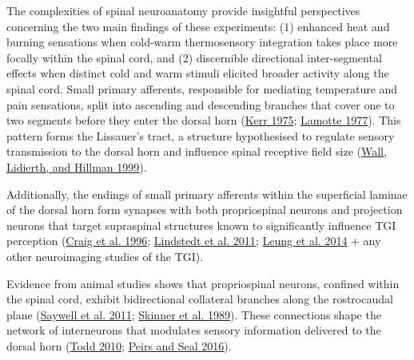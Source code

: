 \documentclass[
]{article}
\begin{document}
The complexities of spinal neuroanatomy provide insightful perspectives
concerning the two main findings of these experiments: (1) enhanced heat
and burning sensations when cold-warm thermosensory integration takes
place more focally within the spinal cord, and (2) discernible
directional inter-segmental effects when distinct cold and warm stimuli
elicited broader activity along the spinal cord. Small primary
afferents, responsible for mediating temperature and pain sensations,
split into ascending and descending branches that cover one to two
segments before they enter the dorsal horn
(\protect\hyperlink{ref-kerr_neuroanatomical_1975}{Kerr 1975};
\protect\hyperlink{ref-lamotte_distribution_1977}{Lamotte 1977}). This
pattern forms the Lissauer's tract, a structure hypothesised to regulate
sensory transmission to the dorsal horn and influence spinal receptive
field size (\protect\hyperlink{ref-wall_brief_1999}{Wall, Lidierth, and
Hillman 1999}).

Additionally, the endings of small primary afferents within the
superficial laminae of the dorsal horn form synapses with both
propriospinal neurons and projection neurons that target supraspinal
structures known to significantly influence TGI perception
(\protect\hyperlink{ref-craig_functional_1996}{Craig et al. 1996};
\protect\hyperlink{ref-lindstedt_evidence_2011}{Lindstedt et al. 2011};
\protect\hyperlink{ref-leung_supraspinal_2014}{Leung et al. 2014} + any
other neuroimaging studies of the TGI).

Evidence from animal studies shows that propriospinal neurons, confined
within the spinal cord, exhibit bidirectional collateral branches along
the rostrocaudal plane
(\protect\hyperlink{ref-saywell_electrophysiological_2011}{Saywell et
al. 2011}; \protect\hyperlink{ref-skinner_ascending_1989}{Skinner et al.
1989}). These connections shape the network of interneurons that
modulates sensory information delivered to the dorsal horn
(\protect\hyperlink{ref-todd_neuronal_2010}{Todd 2010};
\protect\hyperlink{ref-peirs_neural_2016}{Peirs and Seal 2016}).
\end{document}
